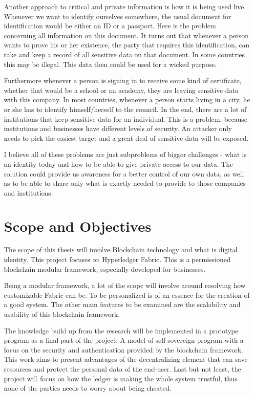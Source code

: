 \documentclass[a4paper,11pt]{report}
\begin{document}
		Another approach to critical and private information is how it is being used live. Whenever we want to identify ourselves somewhere, the usual document for identification would be either an ID or a passport. Here is the problem concerning all information on this document. It turns out that whenever a person wants to prove his or her existence, the party that requires this identification, can take and keep a record of all sensitive data on that document. In some countries this may be illegal. This data then could be used for a wicked purpose. \cite{alboaie2017private}
		
Furthermore whenever a person is signing in to receive some kind of certificate, whether that would be a school or an academy, they are leaving sensitive data with this company. In most countries, whenever a person starts living in a city, he or she has to identify himself/herself to the council. In the end, there are a lot of institutions that keep sensitive data for an individual. This is a problem, because institutions and businesses have different levels of security. An attacker only needs to pick the easiest target and a great deal of sensitive data will be exposed. 

	I believe all of these problems are just  subproblems of bigger challenges - what is an identity today and how to be able to give private access to our data. The solution could provide us awareness for a better control of our own data, as well as to be able to share only what is exactly needed to provide to those companies and institutions.

\section{Scope and Objectives}

\label{introduction-objectives}

The scope of this thesis will involve Blockchain technology and what is digital identity. This project focuses on Hyperledger Fabric. This is a permissioned blockchain modular framework, especially developed for businesses.
 
Being a modular framework, a lot of the scope will involve around resolving how customizable Fabric can be. To be personalized is of an essence for the creation of a good system. The other main features to be examined are the scalability and usability of this blockchain framework.   

The knowledge build up from the research will be implemented in a prototype program as a final part of the project. A model of self-sovereign program  with a focus on the security and authentication provided by the blockchain framework. This work aims to present advantages of the decentralizing element that can save resources and protect the personal data of the end-user. Last but not least, the project will focus on how the ledger is making the whole system trustful, thus none of the parties needs to worry about being cheated. 
 	
\end{document}
